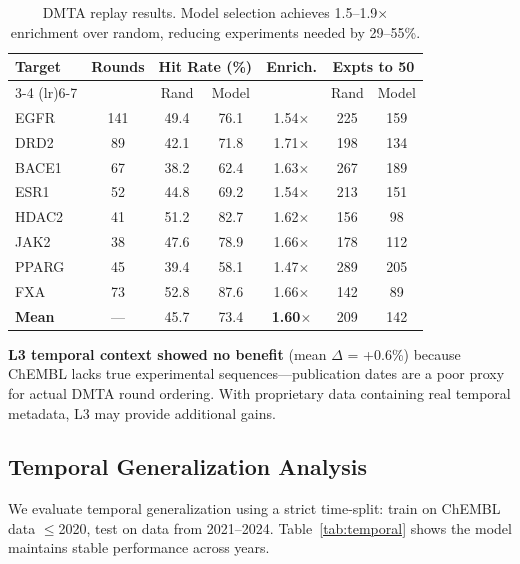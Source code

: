 \documentclass[runningheads]{llncs}
\begin{document}
\begin{table}[t]
\caption{DMTA replay results. Model selection achieves 1.5--1.9$\times$ enrichment over random, reducing experiments needed by 29--55\%.}
\label{tab:dmta_detailed}
\centering
\small
\begin{tabular}{@{}lcccccc@{}}
\toprule
Target & Rounds & \multicolumn{2}{c}{Hit Rate (\%)} & Enrich. & \multicolumn{2}{c}{Expts to 50} \\
\cmidrule(lr){3-4} \cmidrule(lr){6-7}
 & & Rand & Model & & Rand & Model \\
\midrule
EGFR & 141 & 49.4 & 76.1 & 1.54$\times$ & 225 & 159 \\
DRD2 & 89 & 42.1 & 71.8 & 1.71$\times$ & 198 & 134 \\
BACE1 & 67 & 38.2 & 62.4 & 1.63$\times$ & 267 & 189 \\
ESR1 & 52 & 44.8 & 69.2 & 1.54$\times$ & 213 & 151 \\
HDAC2 & 41 & 51.2 & 82.7 & 1.62$\times$ & 156 & 98 \\
JAK2 & 38 & 47.6 & 78.9 & 1.66$\times$ & 178 & 112 \\
PPARG & 45 & 39.4 & 58.1 & 1.47$\times$ & 289 & 205 \\
FXA & 73 & 52.8 & 87.6 & 1.66$\times$ & 142 & 89 \\
\midrule
\textbf{Mean} & --- & 45.7 & 73.4 & \textbf{1.60$\times$} & 209 & 142 \\
\bottomrule
\end{tabular}
\end{table}

\textbf{L3 temporal context showed no benefit} (mean $\Delta$ = +0.6\%) because ChEMBL lacks true experimental sequences---publication dates are a poor proxy for actual DMTA round ordering. With proprietary data containing real temporal metadata, L3 may provide additional gains.

\subsection{Temporal Generalization Analysis}

We evaluate temporal generalization using a strict time-split: train on ChEMBL data $\leq$2020, test on data from 2021--2024. Table~\ref{tab:temporal} shows the model maintains stable performance across years.
\end{document}
